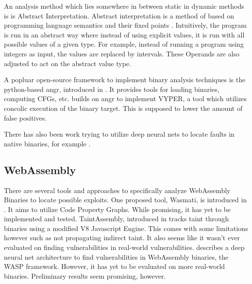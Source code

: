 \documentclass[sigconf]{acmart}
\begin{document}
An analysis method which lies somewhere in between static in dynamic methods is is Abstract Interpretation. Abstract interpretation is a method of based on programming language semantics and their fixed points \cite{cousot_abstract_2000}. Intuitively, the program is run in an abstract way where instead of using explicit values, it is run with all possible values of a given type. For example, instead of running a program using integers as input, the values are replaced by intervals. These Operands are also adjusted to act on the abstract value type. 

A popluar open-source framework to implement binary analysis techniques is the python-based angr, introduced in \cite{shoshitaishvili_sok_2016}. It provides tools for loading binaries, computing CFGs, etc. \cite{boudjema_vyper_2020} builds on angr to implement VYPER, a tool which utilizes concolic execution of the binary target. This is supposed to lower the amount of false positives. 

There has also been work trying to utilize deep neural nets to locate faults in native binaries, for example \cite{li_locating_2019}.

\subsection{WebAssembly}
\label{sec:wasm_analysis}
There are several tools and approaches to specifically analyze WebAssembly Binaries to locate possible exploits. One proposed tool, Wasmati, is introduced in \cite{lopes_discovering_2021}. It aims to utilize Code Property Graphs. While promising, it has yet to be implemented and tested. TaintAssembly, introduced in \cite{fu_taintassembly_2018} tracks taint through binaries using a modified V8 Javascript Engine. This comes with some limitations however such as not propagating indirect taint. It also seems like it wasn't ever evaluated on finding vulnerabilities in real-world vulnerabilities. \cite{sun_poster_2021} describes a deep neural net architecture to find vulnerabilities in WebAssembly binaries, the WASP framework. However, it has yet to be evaluated on more real-world binaries. Preliminary results seem promising, however. 
\end{document}
